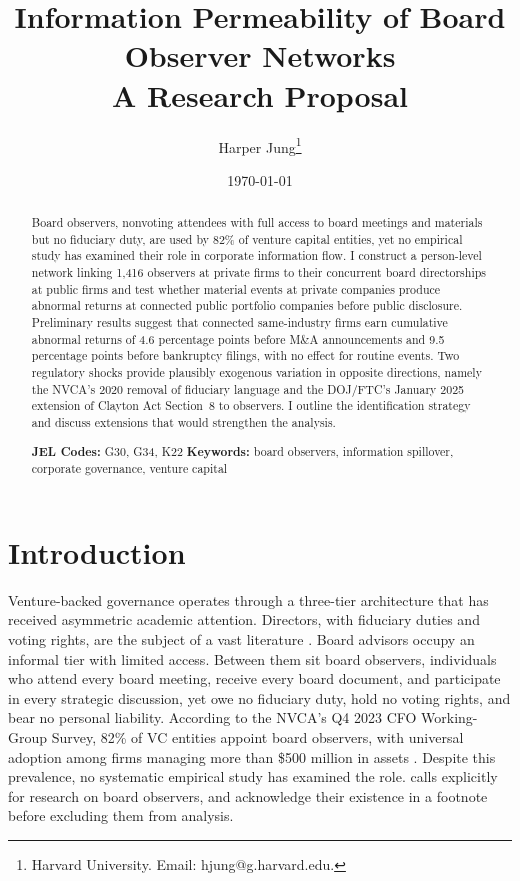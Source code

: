 \documentclass[12pt]{article}
\title{Information Permeability of Board Observer Networks\\A Research Proposal}
\author{
Harper Jung\thanks{Harvard University. Email: hjung@g.harvard.edu.}
}
\date{\today}
\begin{document}
\maketitle
\thispagestyle{empty}

\begin{abstract}
\noindent
Board observers, nonvoting attendees with full access to board meetings and materials but no fiduciary duty, are used by 82\% of venture capital entities, yet no empirical study has examined their role in corporate information flow. I construct a person-level network linking 1,416 observers at private firms to their concurrent board directorships at public firms and test whether material events at private companies produce abnormal returns at connected public portfolio companies before public disclosure. Preliminary results suggest that connected same-industry firms earn cumulative abnormal returns of 4.6 percentage points before M\&A announcements and 9.5 percentage points before bankruptcy filings, with no effect for routine events. Two regulatory shocks provide plausibly exogenous variation in opposite directions, namely the NVCA's 2020 removal of fiduciary language and the DOJ/FTC's January 2025 extension of Clayton Act Section~8 to observers. I outline the identification strategy and discuss extensions that would strengthen the analysis.

\medskip
\noindent \textbf{JEL Codes:} G30, G34, K22 \quad \textbf{Keywords:} board observers, information spillover, corporate governance, venture capital
\end{abstract}

\newpage
\setcounter{page}{1}

\section{Introduction}
\label{sec:intro}

Venture-backed governance operates through a three-tier architecture that has received asymmetric academic attention. Directors, with fiduciary duties and voting rights, are the subject of a vast literature \cite{hermalin2003boards,adams2010role}. Board advisors occupy an informal tier with limited access. Between them sit board observers, individuals who attend every board meeting, receive every board document, and participate in every strategic discussion, yet owe no fiduciary duty, hold no voting rights, and bear no personal liability. According to the NVCA's Q4 2023 CFO Working-Group Survey, 82\% of VC entities appoint board observers, with universal adoption among firms managing more than \$500 million in assets \cite{packin2025board}. Despite this prevalence, no systematic empirical study has examined the role.  calls explicitly for research on board observers, and  acknowledge their existence in a footnote before excluding them from analysis.
\end{document}
